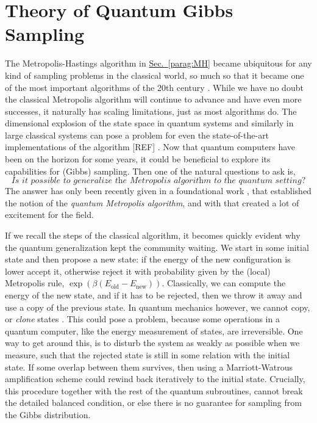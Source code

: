 \part{Theory of Quantum Gibbs Sampling}

The Metropolis-Hastings algorithm in \hyperref[parag:MH]{Sec.~\ref*{parag:MH}} became ubiquitous for any kind of sampling problems in the classical world, so much so that it became one of the most important algorithms of the 20th century \cite{dongarra2000guest}. While we have no doubt the classical Metropolis algorithm will continue to advance and have even more successes, it naturally has scaling limitations, just as most algorithms do. The dimensional explosion of the state space in quantum systems and similarly in large classical systems can pose a problem for even the state-of-the-art implementations of the algorithm [REF] . Now that quantum computers have been on the horizon for some years, it could be beneficial to explore its capabilities for (Gibbs) sampling. Then one of the natural questions to ask is,
$$\textit{Is it possible to generalize the Metropolis algorithm to the quantum setting?}$$
The answer has only been recently given in a foundational work \cite{temme2011quantum}, that established the notion of the \textit{quantum Metropolis algorithm}, and with that created a lot of excitement for the field.

If we recall the steps of the classical algorithm, it becomes quickly evident why the quantum generalization kept the community waiting. We start in some initial state and then propose a new state: if the energy of the new configuration is lower accept it, otherwise reject it with probability given by the (local) Metropolis rule, $\exp(\beta(E_\text{old} - E_\text{new}))$. Classically, we can compute the energy of the new state, and if it has to be rejected, then we throw it away and use a copy of the previous state. In quantum mechanics however, we cannot copy, or \textit{clone} states \cite{wootters1982single}. This could pose a problem, because some operations in a quantum computer, like the energy measurement of states, are irreversible. One way to get around this, is to disturb the system as weakly as possible when we measure, such that the rejected state is still in some relation with the initial state. If some overlap between them survives, then using a Marriott-Watrous amplification scheme \cite{marriott2005quantum} could rewind back iteratively to the initial state. Crucially, this procedure together with the rest of the quantum subroutines, cannot break the detailed balanced condition, or else there is no guarantee for sampling from the Gibbs distribution. 

